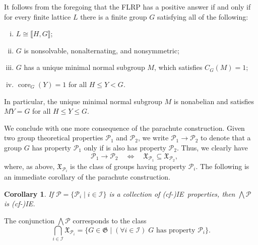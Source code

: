 \documentclass{gen-j-l}
\newcommand{\lb}{\ensuremath{\llbracket}}
\newcommand{\rb}{\ensuremath{\rrbracket}}
\newcommand{\<}{\ensuremath{\langle}}
\renewcommand{\>}{\ensuremath{\rangle}}
\theoremstyle{plain}
\newtheorem{corollary}[theorem]{Corollary}
\theoremstyle{definition}
\theoremstyle{remark}
\numberwithin{theorem}{section}
\numberwithin{claim}{section}
\numberwithin{equation}{section}
\numberwithin{conjecture}{section}
\renewcommand{\leq}{\ensuremath{\leqslant}}
\newcommand{\Meet}{\ensuremath{\bigwedge}}
\newcommand{\core}{\ensuremath{\operatorname{core}}}
\newcommand{\2}{\ensuremath{\mathbf{2}}}
\newcommand{\3}{\ensuremath{\mathbf{3}}}
\newcommand{\sG}{\ensuremath{\mathfrak{X}}}
\newcommand{\G}{\ensuremath{\mathfrak{G}}}
\newcommand{\sI}{\ensuremath{\mathscr{I}}}
\newcommand{\sP}{\ensuremath{\mathscr{P}}}
\newcommand{\cP}{\ensuremath{\mathcal{P}}}
\newcommand{\IE}{{\small IE}}
\begin{document}
It follows from the foregoing that the \acs{FLRP} has a positive answer if and
only if for every finite lattice $L$ there is a finite group $G$ satisfying all
of the following:
\begin{enumerate}[(i)]
\item $L\cong \lb H, G \rb$;
\item $G$ is nonsolvable, nonalternating, and nonsymmetric;
\item $G$ has a unique minimal normal subgroup $M$, which satisfies $C_G(M) = 1$;
\item $\core_G(Y) = 1$ for all $H\leq Y < G$.
\end{enumerate}
In particular, the unique minimal normal subgroup $M$ is nonabelian 
and satisfies $MY = G$ for all $H\leq Y \leq G$.

We conclude with one more consequence of the parachute construction.
Given two group theoretical properties $\cP_1$ and $\cP_2$, we write
$\cP_1 \longrightarrow \cP_2$ to denote that a group $G$ has property $\cP_1$ only
if is also has property $\cP_2$. 
Thus, we clearly have 
\[
\quad \cP_1 \longrightarrow \cP_2 \quad
\Longleftrightarrow \quad \sG_{\cP_1}\subseteq
\sG_{\cP_2},
\]
where, as above, $\sG_{\cP_i}$ is the class of groups 
having property $\cP_i$.
The following is an immediate corollary of the parachute construction.
\begin{corollary}
\label{cor:isle-prop-groups-1}
  If $\sP = \{\cP_i \mid i\in \sI\}$ is a collection of (cf-)\IE\ properties,
  then $\Meet \sP$ is (cf-)\IE.
\end{corollary}
\noindent The conjunction $\Meet \sP$ corresponds to the class 
\[
\bigcap_{i\in \sI} \sG_{\cP_i} = \{G \in \G \mid (\forall i \in \sI) \; 
G \text{ has property } \cP_i \}.
\]
 
% 
%

\end{document}
